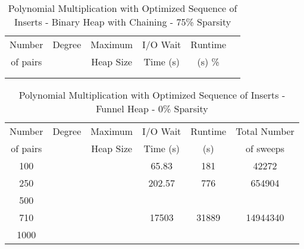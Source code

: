 \documentclass[11pt, one-sided]{amsart}
\begin{document}
\begin{table}[htbp]
   \centering
      \caption{Polynomial Multiplication with Optimized Sequence of Inserts - Binary Heap with Chaining - 75\% Sparsity}
   \begin{tabular}{|c|c|c|c|c|c|}
   	\hline
		 Number   & 	Degree	& Maximum & I/O Wait		& Runtime 	 \\ 
		 of pairs 	&			& Heap Size	& Time (s)		&	(s)		 		\%				\\ \hline
		 		&			&			&			&						\\
		 		&			&			&			&						\\
   \end{tabular}
   \label{tab:booktabs}
\end{table}







\newpage


\begin{table}[htbp]
   \centering
      \caption{Polynomial Multiplication with Optimized Sequence of Inserts - Funnel Heap - 0\% Sparsity}
   \begin{tabular}{|c|c|c|c|c|c|}
   	\hline
		 Number   & 	Degree	& Maximum 	& I/O Wait		&  Runtime 	& Total Number		 \\ 
		 of pairs 	&			& Heap Size	& Time (s)		&	(s)	 	& of sweeps			\\ \hline
		 100		&			&			&	65.83	&	181		&	42272				\\
		 250		&			&			&	202.57	&	776		&	654904				\\
		 500		&			&			&			&			&				\\
		 710		&			&			&	17503	&	31889	&	14944340			\\
		1000		&			&			&			&			&				\\
	\hline
   \end{tabular}
   \label{tab:booktabs}
\end{table}
\end{document}
